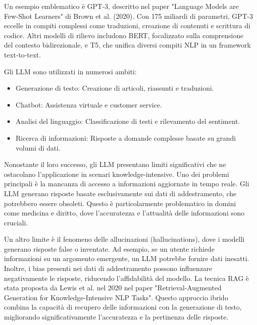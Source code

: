 \documentclass[a4paper,twoside,12pt]{toptesi}
\begin{document}
Un esempio emblematico è GPT-3, descritto nel paper "Language Models are Few-Shot Learners" di Brown et al. (2020). Con 175 miliardi di parametri, GPT-3 eccelle in compiti complessi come traduzioni, creazione di contenuti e scrittura di codice. Altri modelli di rilievo includono BERT, focalizzato sulla comprensione del contesto bidirezionale, e T5, che unifica diversi compiti NLP in un framework text-to-text.

Gli LLM sono utilizzati in numerosi ambiti:
\begin{itemize}
\item Generazione di testo: Creazione di articoli, riassunti e traduzioni.
\item Chatbot: Assistenza virtuale e customer service.
\item Analisi del linguaggio: Classificazione di testi e rilevamento del sentiment.
\item Ricerca di informazioni: Risposte a domande complesse basate su grandi volumi di dati.
\end{itemize}

Nonostante il loro successo, gli LLM presentano limiti significativi che ne ostacolano l'applicazione in scenari knowledge-intensive. Uno dei problemi principali è la mancanza di accesso a informazioni aggiornate in tempo reale. Gli LLM generano risposte basate esclusivamente sui dati di addestramento, che potrebbero essere obsoleti. Questo è particolarmente problematico in domini come medicina e diritto, dove l'accuratezza e l'attualità delle informazioni sono cruciali.

Un altro limite è il fenomeno delle allucinazioni (hallucinations), dove i modelli generano risposte false o inventate. Ad esempio, se un utente richiede informazioni su un argomento emergente, un LLM potrebbe fornire dati inesatti. Inoltre, i bias presenti nei dati di addestramento possono influenzare negativamente le risposte, riducendo l'affidabilità del modello. La tecnica RAG è stata proposta da Lewis et al. nel 2020 nel paper "Retrieval-Augmented Generation for Knowledge-Intensive NLP Tasks". Questo approccio ibrido combina la capacità di recupero delle informazioni con la generazione di testo, migliorando significativamente l'accuratezza e la pertinenza delle risposte.
\end{document}
